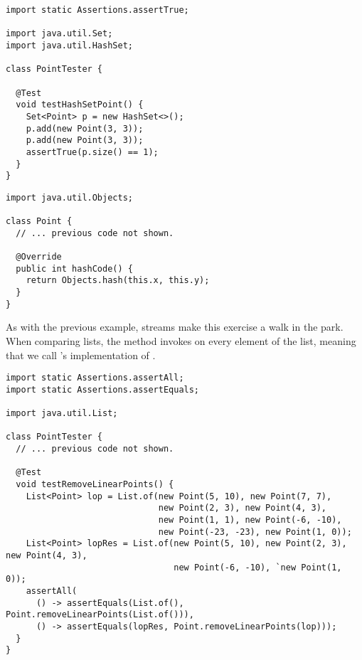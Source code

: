 \enlargethispage{-2\baselineskip}
\begin{lstlisting}[language=MyJava]
import static Assertions.assertTrue;

import java.util.Set;
import java.util.HashSet;

class PointTester {

  @Test
  void testHashSetPoint() {
    Set<Point> p = new HashSet<>();
    p.add(new Point(3, 3));
    p.add(new Point(3, 3));
    assertTrue(p.size() == 1);
  }
}
\end{lstlisting}

\begin{lstlisting}[language=MyJava]
import java.util.Objects;

class Point {
  // ... previous code not shown.

  @Override
  public int hashCode() {
    return Objects.hash(this.x, this.y);
  }
}
\end{lstlisting}

As with the previous example, streams make this exercise a walk in the park. 
When comparing lists, the  method invokes  on every element of the list, meaning that we call 's implementation of .

\begin{lstlisting}[language=MyJava]
import static Assertions.assertAll;
import static Assertions.assertEquals;

import java.util.List;

class PointTester {
  // ... previous code not shown. 

  @Test
  void testRemoveLinearPoints() {
    List<Point> lop = List.of(new Point(5, 10), new Point(7, 7),
                              new Point(2, 3), new Point(4, 3),
                              new Point(1, 1), new Point(-6, -10),
                              new Point(-23, -23), new Point(1, 0));
    List<Point> lopRes = List.of(new Point(5, 10), new Point(2, 3), new Point(4, 3),
                                 new Point(-6, -10), `new Point(1, 0));
    assertAll(
      () -> assertEquals(List.of(), Point.removeLinearPoints(List.of())),
      () -> assertEquals(lopRes, Point.removeLinearPoints(lop)));
  }
}
\end{lstlisting}

